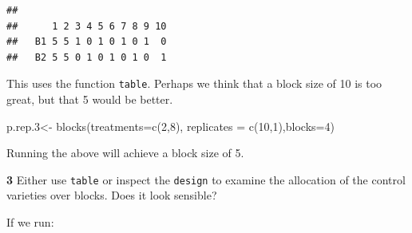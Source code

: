 \documentclass[
]{book}
\makeatletter
\newenvironment{Shaded}{\begin{snugshade}}{\end{snugshade}}
\newcommand{\AttributeTok}[1]{\textcolor[rgb]{0.77,0.63,0.00}{#1}}
\newcommand{\DecValTok}[1]{\textcolor[rgb]{0.00,0.00,0.81}{#1}}
\newcommand{\FloatTok}[1]{\textcolor[rgb]{0.00,0.00,0.81}{#1}}
\newcommand{\FunctionTok}[1]{\textcolor[rgb]{0.00,0.00,0.00}{#1}}
\newcommand{\NormalTok}[1]{#1}
\newcommand{\OtherTok}[1]{\textcolor[rgb]{0.56,0.35,0.01}{#1}}
\newcommand{\SpecialCharTok}[1]{\textcolor[rgb]{0.00,0.00,0.00}{#1}}
\newenvironment{kframe}{%
\medskip{}
\setlength{\fboxsep}{.8em}
 \def\at@end@of@kframe{}%
 \ifinner\ifhmode%
  \def\at@end@of@kframe{\end{minipage}}%
  \begin{minipage}{\columnwidth}%
 \fi\fi%
 \def\FrameCommand##1{\hskip\@totalleftmargin \hskip-\fboxsep
 \colorbox{shadecolor}{##1}\hskip-\fboxsep
     \hskip-\linewidth \hskip-\@totalleftmargin \hskip\columnwidth}%
 \MakeFramed {\advance\hsize-\width
   \@totalleftmargin\z@ \linewidth\hsize
   \@setminipage}}%
 {\par\unskip\endMakeFramed%
 \at@end@of@kframe}
\newenvironment{rmdblock}[1]
  {
  \begin{itemize}
  \renewcommand{\labelitemi}{
    \raisebox{-.7\height}[0pt][0pt]{
      {\setkeys{Gin}{width=3em,keepaspectratio}\texttt{[image: images/\#1]}}
    }
  }
  \setlength{\fboxsep}{1em}
  \begin{kframe}
  \item
  }
  {
  \end{kframe}
  \end{itemize}
  }
\newenvironment{rmdquiz}
  {\begin{rmdblock}{quiz}}
  {\end{rmdblock}}
\makeatother
\begin{document}
\begin{Shaded}
\end{Shaded}

\begin{verbatim}
##     
##      1 2 3 4 5 6 7 8 9 10
##   B1 5 5 1 0 1 0 1 0 1  0
##   B2 5 5 0 1 0 1 0 1 0  1
\end{verbatim}

This uses the function \texttt{table}. Perhaps we think that a block size of 10 is too great, but that 5 would be better.

\begin{Shaded}
\begin{Highlighting}[]
\NormalTok{p.rep}\FloatTok{.3}\OtherTok{\textless{}{-}} \FunctionTok{blocks}\NormalTok{(}\AttributeTok{treatments=}\FunctionTok{c}\NormalTok{(}\DecValTok{2}\NormalTok{,}\DecValTok{8}\NormalTok{), }\AttributeTok{replicates =} \FunctionTok{c}\NormalTok{(}\DecValTok{10}\NormalTok{,}\DecValTok{1}\NormalTok{),}\AttributeTok{blocks=}\DecValTok{4}\NormalTok{)}
\end{Highlighting}
\end{Shaded}

Running the above will achieve a block size of 5.

\begin{rmdquiz}
\textbf{3} Either use \texttt{table} or inspect the \texttt{design} to examine the allocation of the control varieties over blocks. Does it look sensible?
\end{rmdquiz}

If we run:

\begin{Shaded}
\end{Shaded}
\end{document}
